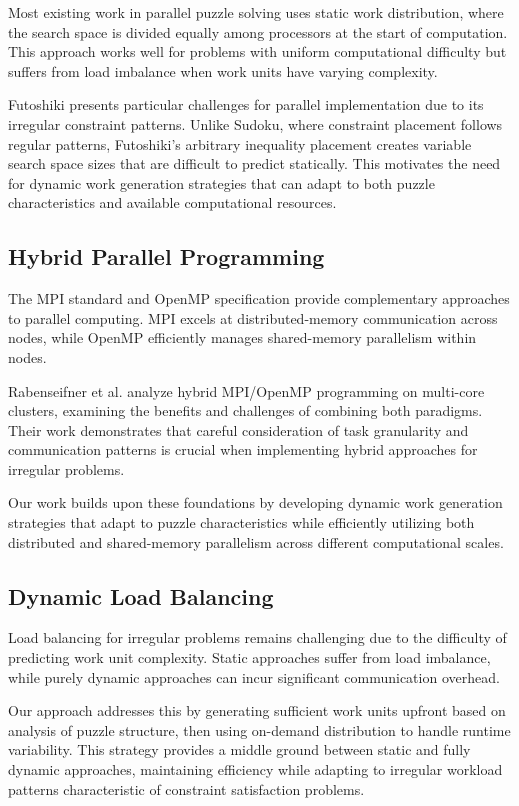 Most existing work in parallel puzzle solving uses static work distribution, where the search space is divided equally among processors at the start of computation. This approach works well for problems with uniform computational difficulty but suffers from load imbalance when work units have varying complexity.

Futoshiki presents particular challenges for parallel implementation due to its irregular constraint patterns. Unlike Sudoku, where constraint placement follows regular patterns, Futoshiki's arbitrary inequality placement creates variable search space sizes that are difficult to predict statically. This motivates the need for dynamic work generation strategies that can adapt to both puzzle characteristics and available computational resources.

\subsection{Hybrid Parallel Programming}
\label{subsec:hybrid_programming}
The MPI standard \cite{MPIForum2021} and OpenMP specification \cite{OpenMP2020} provide complementary approaches to parallel computing. MPI excels at distributed-memory communication across nodes, while OpenMP efficiently manages shared-memory parallelism within nodes.

Rabenseifner et al. \cite{Rabenseifner2009} analyze hybrid MPI/OpenMP programming on multi-core clusters, examining the benefits and challenges of combining both paradigms. Their work demonstrates that careful consideration of task granularity and communication patterns is crucial when implementing hybrid approaches for irregular problems.

Our work builds upon these foundations by developing dynamic work generation strategies that adapt to puzzle characteristics while efficiently utilizing both distributed and shared-memory parallelism across different computational scales.

\subsection{Dynamic Load Balancing}
\label{subsec:dynamic_load_balancing}
Load balancing for irregular problems remains challenging due to the difficulty of predicting work unit complexity. Static approaches suffer from load imbalance, while purely dynamic approaches can incur significant communication overhead.

Our approach addresses this by generating sufficient work units upfront based on analysis of puzzle structure, then using on-demand distribution to handle runtime variability. This strategy provides a middle ground between static and fully dynamic approaches, maintaining efficiency while adapting to irregular workload patterns characteristic of constraint satisfaction problems.